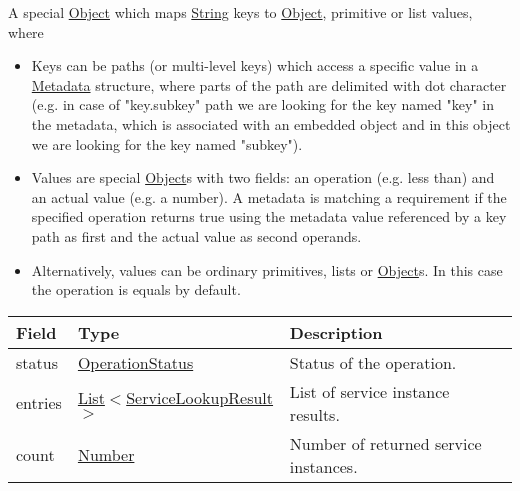 \documentclass[a4paper]{arrowhead}
\newcommand{\pref}[1]{{\textcolor{ArrowheadGrey}{\hyperref[sec:model:primitives:#1]{#1}}}}
\begin{document}

A special \pref{Object} which maps \pref{String} keys to \pref{Object}, primitive or list values, where 

\begin{itemize}
    \item Keys can be paths (or multi-level keys) which access a specific value in a \hyperref[sec:model:Metadata]{Metadata} structure, where parts of the path are delimited with dot character (e.g. in case of "key.subkey" path we are looking for the key named "key" in the metadata, which is associated with an embedded object and in this object we are looking for the key named "subkey").
    \item Values are special \pref{Object}s with two fields: an operation (e.g. less than) and an actual value (e.g. a number). A metadata is matching a requirement if the specified operation returns true using the metadata value referenced by a key path as first and the actual value as second operands. 
    \item Alternatively, values can be ordinary primitives, lists or \pref{Object}s. In this case the operation is equals by default.
\end{itemize}


\begin{table}[ht!]
\begin{tabularx}{\textwidth}{| p{2.5cm} | p{4.5cm} | X |} \hline
\rowcolor{gray!33} Field & Type      & Description \\ \hline
status & \pref{OperationStatus} & Status of the operation. \\ \hline
entries & \pref{List}$<$\hyperref[sec:model:ServiceLookupResult]{ServiceLookupResult}$>$     & List of service instance results. \\ \hline
count & \pref{Number} & Number of returned service instances. \\ \hline
\end{tabularx}
\end{table}

 
\end{document}

